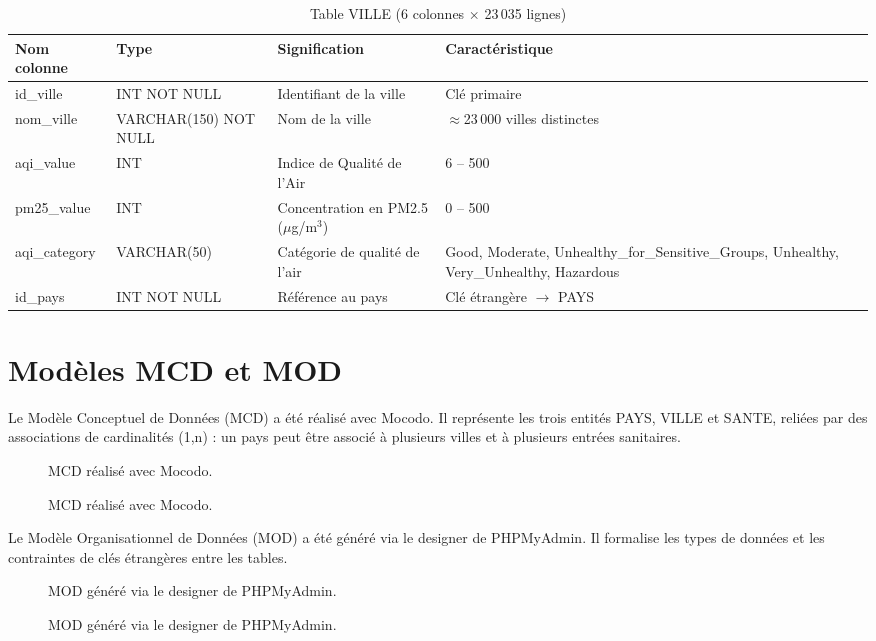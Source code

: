 \documentclass[mstat,12pt]{unswthesis}
\begin{document}
\begin{table}[H]
\centering
\renewcommand{\arraystretch}{1.3}
\begin{tabular}{|p{3cm}|p{3.5cm}|p{3cm}|p{4.5cm}|}
\hline
\textbf{Nom colonne} & \textbf{Type} & \textbf{Signification} & \textbf{Caractéristique} \\ \hline
id\_ville & INT NOT NULL & Identifiant de la ville & Clé primaire \\ \hline
nom\_ville & VARCHAR(150) NOT NULL & Nom de la ville & $\approx$23\,000 villes distinctes \\ \hline
aqi\_value & INT & Indice de Qualité de l'Air & 6 -- 500 \\ \hline
pm25\_value & INT & Concentration en PM2.5 ($\mu$g/m$^3$) & 0 -- 500 \\ \hline
aqi\_category & VARCHAR(50) & Catégorie de qualité de l'air & Good, Moderate, Unhealthy\_for\_Sensitive\_Groups, Unhealthy, Very\_Unhealthy, Hazardous \\ \hline
id\_pays & INT NOT NULL & Référence au pays & Clé étrangère $\rightarrow$ PAYS \\ \hline
\end{tabular}
\medskip
\caption{Table VILLE (6 colonnes $\times$ 23\,035 lignes)}
\end{table}

\section{Modèles MCD et MOD}\label{moduxe8les-mcd-et-mod}

Le Modèle Conceptuel de Données (MCD) a été réalisé avec Mocodo. Il
représente les trois entités PAYS, VILLE et SANTE, reliées par des
associations de cardinalités (1,n) : un pays peut être associé à
plusieurs villes et à plusieurs entrées sanitaires.

\begin{figure}
\centering
{MCD réalisé avec Mocodo.}
\caption{MCD réalisé avec Mocodo.}\label{mcd}
\end{figure}

\bigskip

Le Modèle Organisationnel de Données (MOD) a été généré via le designer
de PHPMyAdmin. Il formalise les types de données et les contraintes de
clés étrangères entre les tables.

\begin{figure}
\centering
{MOD généré via le designer de PHPMyAdmin.}
\caption{MOD généré via le designer de PHPMyAdmin.}\label{mod}
\end{figure}
\end{document}
